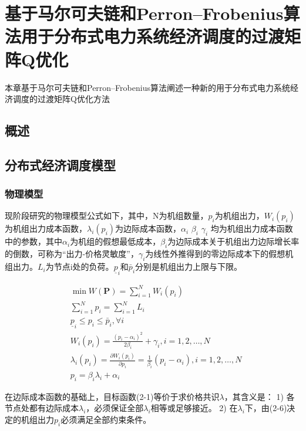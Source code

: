 \chapter{基于马尔可夫链和Perron–Frobenius算法用于分布式电力系统经济调度的过渡矩阵Q优化}
\label{cha:Algorithm}

本章基于马尔可夫链和Perron–Frobenius算法阐述一种新的用于分布式电力系统经济调度的过渡矩阵Q优化方法

\section{概述}


\section{分布式经济调度模型}

\subsection{物理模型}

现阶段研究的物理模型公式如下，其中，N为机组数量，$p_{i}$为机组出力，$W_{i}\left(p_{i}\right)$为机组出力成本函数，$\lambda_{i}\left(p_{i}\right)$为边际成本函数，$\alpha_{i}$ $\beta_{i}$ $\gamma_{i}$ 均为机组出力成本函数中的参数，其中$\alpha_{i}$为机组的假想最低成本，$\beta_{i}$为边际成本关于机组出力边际增长率的倒数，可称为“出力-价格灵敏度”，$\gamma_{i}$为线性外推得到的零边际成本下的假想机组出力。$L_{i}$为节点i处的负荷。$\underline{p}_{i}$和$\bar{p}_{i}$分别是机组出力上限与下限。

\begin{equation}
    \begin{aligned}
    &\min W(\mathbf{P})=\sum_{i=1}^{N} W_{i}\left(p_{i}\right)\\
    &\sum_{i=1}^{N} p_{i}=\sum_{i=1}^{N} L_{i}\\
    &\underline{p}_{i} \leq p_{i} \leq \bar{p}_{i}, \forall i\\
    &W_{i}\left(p_{i}\right)=\frac{\left(p_{i}-\alpha_{i}\right)^{2}}{2 \beta_{i}}+\gamma_{i}, i=1,2, \ldots, N\\
    &\lambda_{i}\left(p_{i}\right)=\frac{\partial W_{i}\left(p_{i}\right)}{\partial p_{i}}=\frac{1}{\beta_{i}}\left(p_{i}-\alpha_{i}\right), i=1,2, \ldots, N\\
    &p_{i}=\beta_{i} \lambda_{i}+\alpha_{i}
    \end{aligned}
\end{equation}

在边际成本函数的基础上，目标函数(2-1)等价于求价格共识$\lambda$，其含义是：
1) 各节点处都有边际成本$\lambda_{i}$，必须保证全部$\lambda_{i}$相等或足够接近。
2) 在$\lambda_{i}$下，由(2-6)决定的机组出力$p_{i}$必须满足全部约束条件。

